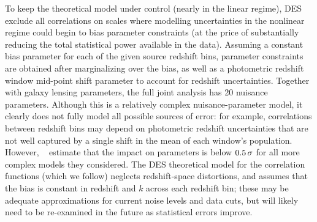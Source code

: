 \documentclass[longauth,traditabstract]{aa}
\def\,{\thinspace}
\begin{document}
To keep the theoretical model under control (nearly in the linear regime), DES exclude
all correlations on scales where modelling uncertainties in the nonlinear regime could begin to  bias parameter constraints (at the price of substantially reducing the total statistical power available in the data). %
Assuming a constant bias parameter for each of the given source redshift bins, parameter constraints are obtained after marginalizing over the bias, as well as a photometric redshift window mid-point shift parameter to account for redshift uncertainties. Together with galaxy lensing parameters, the full joint analysis has 20 nuisance parameters. Although this is a relatively complex nuisance-parameter model, it clearly does not fully model all possible sources of error: for example, correlations between redshift bins may depend on photometric redshift uncertainties that are not well captured by a single shift in the mean of each window's population. However, ~\citet{Troxel:2017xyo} estimate that the impact on parameters is below $0.5\,\sigma$ for all more complex models they considered.
The DES theoretical model for the correlation functions (which we follow) neglects redshift-space distortions, and assumes that the bias is constant in redshift and $k$ across each redshift bin; these may be adequate approximations for current noise levels and data cuts, but will likely need to be re-examined in the future as statistical errors improve.
\end{document}
